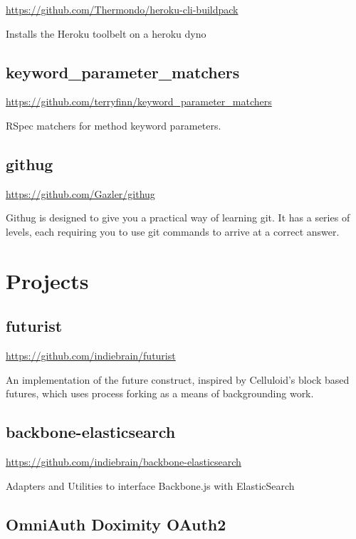 \documentclass[12pt letterpaper notitlepage]{article}
\begin{document}
\url{https://github.com/Thermondo/heroku-cli-buildpack}

Installs the Heroku toolbelt on a heroku dyno

\subsection*{keyword\_parameter\_matchers}
\label{sec-3-2}

\url{https://github.com/terryfinn/keyword_parameter_matchers}

RSpec matchers for method keyword parameters.

\subsection*{githug}
\label{sec-3-3}

\url{https://github.com/Gazler/githug}

Githug is designed to give you a practical way of learning git. It has a series
of levels, each requiring you to use git commands to arrive at a correct answer.

\section*{Projects}
\label{sec-4}

\subsection*{futurist}
\label{sec-4-1}

\url{https://github.com/indiebrain/futurist}

An implementation of the future construct, inspired by Celluloid's block based
futures, which uses process forking as a means of backgrounding work.

\subsection*{backbone-elasticsearch}
\label{sec-4-2}

\url{https://github.com/indiebrain/backbone-elasticsearch}

Adapters and Utilities to interface Backbone.js with ElasticSearch

\subsection*{OmniAuth Doximity OAuth2}
\label{sec-4-3}
\end{document}

